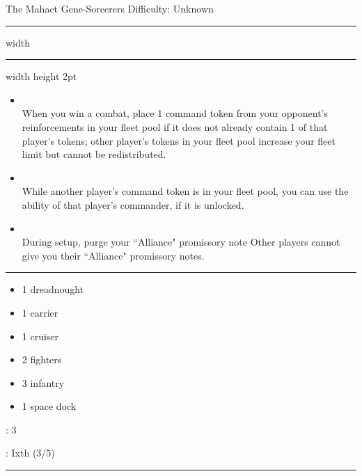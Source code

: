 {\handel\Huge The Mahact Gene-Sorcerers} \hfill {\Large Difficulty: Unknown} \vspace{-4pt}\\
\hrule width \hsize \kern 1mm \hrule width \hsize height 2pt


\begin{multicols}{2}


\begin{itemize}
\item {}\\
When you win a combat, place 1 command token from your opponent's reinforcements in your fleet pool if it does not already contain 1 of that player's tokens; other player's tokens in your fleet pool increase your fleet limit but cannot be redistributed.
\item {}\\
While another player's command token is in your fleet pool, you can use the ability of that player's commander, if it is unlocked.
\item {}\\
During setup, purge your ``Alliance" promissory note Other players cannot give you their ``Alliance" promissory notes.
\end{itemize}


\vspace{-10pt}\rule{\hsize}{0.4pt}\vspace{5pt}


\vspace{-5pt}
\begin{multicols}{2}
\begin{itemize}
\item 1 dreadnought
\item 1 carrier
\item 1 cruiser
\item 2 fighters
\item 3 infantry
\item 1 space dock
\end{itemize}
\end{multicols}

\vspace{-5pt}
: 3

\vspace{2pt}
: Ixth (3/5)

\rule{\hsize}{0.4pt}\vspace{5pt}


\end{multicols}
